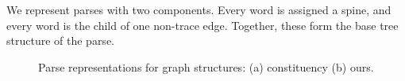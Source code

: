 We represent parses with two components.
Every word is assigned a spine, and every word is the child of one non-trace edge.
Together, these form the base tree structure of the parse.

\begin{figure}
  \centering
  \scalebox{1.0}{
    
  }
  \caption[Parse representations for graph structures.]{ \label{fig:repr2}
    Parse representations for graph structures: (a) constituency (b) ours.
  }
\end{figure}









